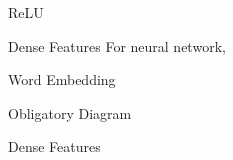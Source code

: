 \documentclass{beamer}
\begin{document}
\begin{frame}{ReLU}
  
\end{frame}


\begin{frame}{Dense Features}
  For neural network, 


\end{frame}


\begin{frame}{Word Embedding}
  
\end{frame}


\begin{frame}{}
  Obligatory Diagram
\end{frame}

\begin{frame}{Dense Features}
  
\end{frame}
\end{document}
